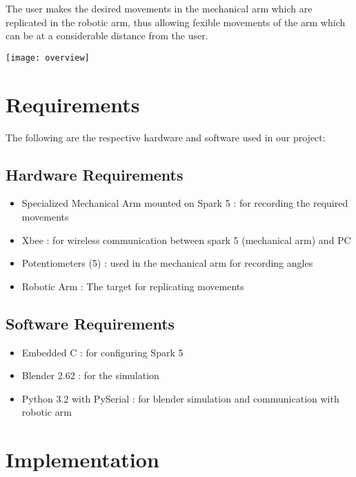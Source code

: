 \documentclass[a4wide]{article}
\begin{document}
 The user makes the desired movements in the mechanical arm which are replicated in the robotic arm, thus allowing fexible movements of the arm which can be at a considerable distance from the user.


\texttt{[image: overview]}

\newpage
\section{Requirements}
\hbox{}
The following are the respective hardware and software used in our project:\\
\subsection{Hardware Requirements}
\hbox{}
\begin{itemize}
\item   Specialized Mechanical Arm mounted on Spark 5 : for recording the required movements \\
\item   Xbee : for wireless communication between spark 5 (mechanical arm) and PC\\
\item   Potentiometers (5) : used in the mechanical arm for recording angles\\
\item   Robotic Arm :  The target for replicating movements\\
\end{itemize}

\subsection{Software Requirements}
\hbox{}
\begin{itemize}
\item  Embedded C : for configuring Spark 5\\
\item  Blender 2.62 : for the simulation\\
\item  Python 3.2 with PySerial : for blender simulation and communication with robotic arm \\

\end{itemize}

\newpage
\section{Implementation}
\hbox{}
\end{document}

